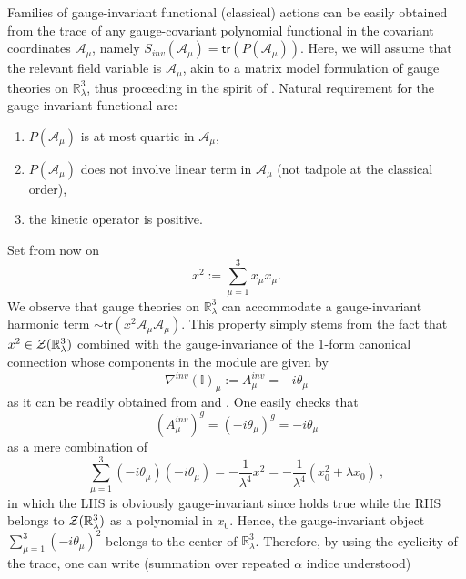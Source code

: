 \documentclass[10pt]{book}
\newcommand{\tr}{\mathsf{tr}}
\theoremstyle{break}
\begin{document}
Families of gauge-invariant functional (classical) actions can be easily obtained from the trace of any gauge-covariant polynomial functional in the covariant coordinates $\mathcal{A}_\mu$, namely $S_{inv}(\mathcal{A}_\mu)=\tr\left(P(\mathcal{A}_\mu)\right)$. Here, we will assume that the relevant field variable is $\mathcal{A}_\mu$, akin to a matrix model formulation of gauge theories on $\mathbb{R}^3_\lambda$, thus proceeding in the spirit of %
. Natural requirement for the gauge-invariant functional are:
\begin{enumerate}
\item $P(\mathcal{A}_\mu)$ is at most quartic in $\mathcal{A}_\mu$,
\item $P(\mathcal{A}_\mu)$ does not involve linear term in $\mathcal{A}_\mu$ (not tadpole at the classical order),
\item the kinetic operator is positive.
\end{enumerate}
Set from now on 
\begin{equation*}
x^2 := \sum_{\mu=1}^3x_\mu x_\mu. 
\end{equation*}
We observe that gauge theories on $\mathbb{R}^3_\lambda$ can accommodate a 
gauge-invariant harmonic term $\sim\tr(x^2\mathcal{A}_\mu \mathcal{A}_\mu)$. This property simply stems from the fact that $x^2\in{\cal{Z}}(\mathbb{R}^3_\lambda)$ combined with the gauge-invariance of the 1-form canonical connection whose components in the module are given by 
\begin{equation*}
\nabla^{inv}( \mathbb{I})_\mu:=A^{inv}_\mu=-i\theta_\mu%
\end{equation*}
as it can be readily obtained from %
and %
. One easily checks that 
\begin{equation*}
(A^{inv}_\mu)^g=(-i\theta_\mu)^g=-i\theta_\mu%
\end{equation*}
as a mere combination of %
\begin{equation*}
\sum_{\mu=1}^3(-i\theta_\mu)(-i\theta_\mu ) = -\frac{1}{\lambda^4}x^2 = -\frac{1}{\lambda^4}(x_0^2+\lambda x_0) \ , %
\end{equation*}
in which the LHS is obviously gauge-invariant since %
holds true while the RHS belongs to ${\cal{Z}}(\mathbb{R}^3_\lambda)$ as a polynomial in $x_0$. Hence, the gauge-invariant object $\sum_{\mu=1}^3(-i\theta_\mu)^2$ belongs to the center of $\mathbb{R}^3_\lambda$. Therefore, by using the cyclicity of the trace, one can write (summation over repeated $\alpha$ indice understood) %
\end{document}
